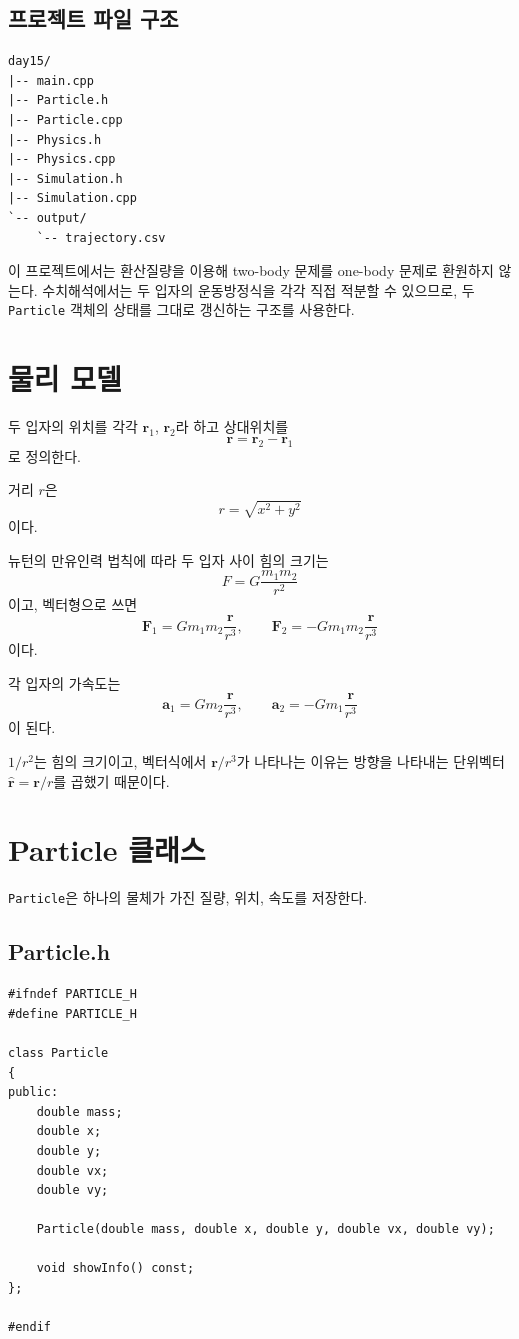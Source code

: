 \documentclass[11pt,a4paper]{article}
\begin{document}
\subsection{프로젝트 파일 구조}
\begin{verbatim}
day15/
|-- main.cpp
|-- Particle.h
|-- Particle.cpp
|-- Physics.h
|-- Physics.cpp
|-- Simulation.h
|-- Simulation.cpp
`-- output/
    `-- trajectory.csv
\end{verbatim}

\begin{importantbox}
이 프로젝트에서는 환산질량을 이용해 two-body 문제를 one-body 문제로 환원하지 않는다. 수치해석에서는 두 입자의 운동방정식을 각각 직접 적분할 수 있으므로, 두 \texttt{Particle} 객체의 상태를 그대로 갱신하는 구조를 사용한다.
\end{importantbox}

\section{물리 모델}
두 입자의 위치를 각각 $\mathbf r_1$, $\mathbf r_2$라 하고 상대위치를
\[
\mathbf r = \mathbf r_2 - \mathbf r_1
\]
로 정의한다.

거리 $r$은
\[
r = \sqrt{x^2+y^2}
\]
이다.

뉴턴의 만유인력 법칙에 따라 두 입자 사이 힘의 크기는
\[
F = G\frac{m_1m_2}{r^2}
\]
이고, 벡터형으로 쓰면
\[
\mathbf F_1 = Gm_1m_2\frac{\mathbf r}{r^3},
\qquad
\mathbf F_2 = -Gm_1m_2\frac{\mathbf r}{r^3}
\]
이다.

각 입자의 가속도는
\[
\mathbf a_1 = Gm_2\frac{\mathbf r}{r^3},
\qquad
\mathbf a_2 = -Gm_1\frac{\mathbf r}{r^3}
\]
이 된다.

\begin{importantbox}
$1/r^2$는 힘의 크기이고, 벡터식에서 $\mathbf r/r^3$가 나타나는 이유는 방향을 나타내는 단위벡터 $\hat{\mathbf r}=\mathbf r/r$를 곱했기 때문이다.
\end{importantbox}

\section{Particle 클래스}
\texttt{Particle}은 하나의 물체가 가진 질량, 위치, 속도를 저장한다.

\subsection{Particle.h}
\begin{lstlisting}
#ifndef PARTICLE_H
#define PARTICLE_H

class Particle
{
public:
    double mass;
    double x;
    double y;
    double vx;
    double vy;

    Particle(double mass, double x, double y, double vx, double vy);

    void showInfo() const;
};

#endif
\end{lstlisting}
\end{document}
